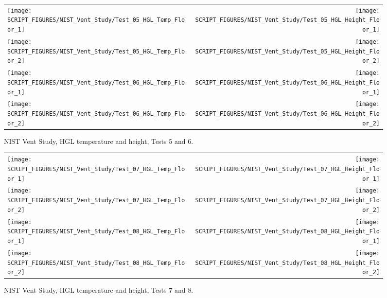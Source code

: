 \begin{figure}[p]
\begin{tabular*}{\textwidth}{l@{\extracolsep{\fill}}r}
\texttt{[image: SCRIPT\_FIGURES/NIST\_Vent\_Study/Test\_05\_HGL\_Temp\_Floor\_1]} &
\texttt{[image: SCRIPT\_FIGURES/NIST\_Vent\_Study/Test\_05\_HGL\_Height\_Floor\_1]} \\
\texttt{[image: SCRIPT\_FIGURES/NIST\_Vent\_Study/Test\_05\_HGL\_Temp\_Floor\_2]} &
\texttt{[image: SCRIPT\_FIGURES/NIST\_Vent\_Study/Test\_05\_HGL\_Height\_Floor\_2]} \\
\texttt{[image: SCRIPT\_FIGURES/NIST\_Vent\_Study/Test\_06\_HGL\_Temp\_Floor\_1]} &
\texttt{[image: SCRIPT\_FIGURES/NIST\_Vent\_Study/Test\_06\_HGL\_Height\_Floor\_1]} \\
\texttt{[image: SCRIPT\_FIGURES/NIST\_Vent\_Study/Test\_06\_HGL\_Temp\_Floor\_2]} &
\texttt{[image: SCRIPT\_FIGURES/NIST\_Vent\_Study/Test\_06\_HGL\_Height\_Floor\_2]}
\end{tabular*}
\caption[NIST Vent Study, HGL temperature and height, Tests 5 and 6]
{NIST Vent Study, HGL temperature and height, Tests 5 and 6.}
\label{NIST_Vent_Study_5_6}
\end{figure}

\begin{figure}[p]
\begin{tabular*}{\textwidth}{l@{\extracolsep{\fill}}r}
\texttt{[image: SCRIPT\_FIGURES/NIST\_Vent\_Study/Test\_07\_HGL\_Temp\_Floor\_1]} &
\texttt{[image: SCRIPT\_FIGURES/NIST\_Vent\_Study/Test\_07\_HGL\_Height\_Floor\_1]} \\
\texttt{[image: SCRIPT\_FIGURES/NIST\_Vent\_Study/Test\_07\_HGL\_Temp\_Floor\_2]} &
\texttt{[image: SCRIPT\_FIGURES/NIST\_Vent\_Study/Test\_07\_HGL\_Height\_Floor\_2]} \\
\texttt{[image: SCRIPT\_FIGURES/NIST\_Vent\_Study/Test\_08\_HGL\_Temp\_Floor\_1]} &
\texttt{[image: SCRIPT\_FIGURES/NIST\_Vent\_Study/Test\_08\_HGL\_Height\_Floor\_1]} \\
\texttt{[image: SCRIPT\_FIGURES/NIST\_Vent\_Study/Test\_08\_HGL\_Temp\_Floor\_2]} &
\texttt{[image: SCRIPT\_FIGURES/NIST\_Vent\_Study/Test\_08\_HGL\_Height\_Floor\_2]}
\end{tabular*}
\caption[NIST Vent Study, HGL temperature and height, Tests 7 and 8]
{NIST Vent Study, HGL temperature and height, Tests 7 and 8.}
\label{NIST_Vent_Study_7_8}
\end{figure}

